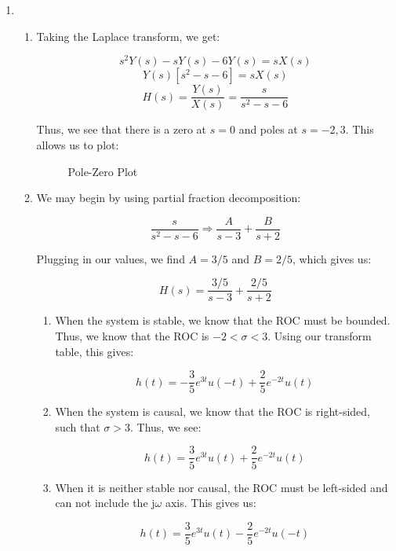 \begin{enumerate}
  \item

    \begin{enumerate}

      \item 

        Taking the Laplace transform, we get:

        $$s^2Y(s)-sY(s)-6Y(s)=sX(s)$$
        $$Y(s)[s^2-s-6]=sX(s)$$
        $$\boxed{H(s)=\frac{Y(s)}{X(s)}=\frac{s}{s^2-s-6}}$$

        Thus, we see that there is a zero at $s=0$ and poles at $s=-2,3$. This allows us to plot:

        \begin{figure}[H]
          \centering
          
          \caption{Pole-Zero Plot}
          \label{fig:1}
        \end{figure}
        
      \item 

        We may begin by using partial fraction decomposition:

        $$\frac{s}{s^2-s-6}\Rightarrow \frac{A}{s-3}+\frac{B}{s+2}$$

        Plugging in our values, we find $A=3/5$ and $B=2/5$, which gives us:

        $$H(s)=\frac{3/5}{s-3}+\frac{2/5}{s+2}$$

        \begin{enumerate}

          \item When the system is stable, we know that the ROC must be bounded. Thus, we know that the ROC is $-2<\sigma<3$. Using our transform table, this gives:

            $$\boxed{h(t)=-\frac{3}{5}e^{3t}u(-t)+\frac{2}{5}e^{-2t}u(t)}$$

          \item When the system is causal, we know that the ROC is right-sided, such that $\sigma>3$. Thus, we see:

            $$\boxed{h(t)=\frac{3}{5}e^{3t}u(t)+\frac{2}{5}e^{-2t}u(t)}$$

          \item When it is neither stable nor causal, the ROC must be left-sided and can not include the j$\omega$ axis. This gives us:

            $$\boxed{h(t)=\frac{3}{5}e^{3t}u(t)-\frac{2}{5}e^{-2t}u(-t)}$$


\end{enumerate}
\end{enumerate}
\end{enumerate}
